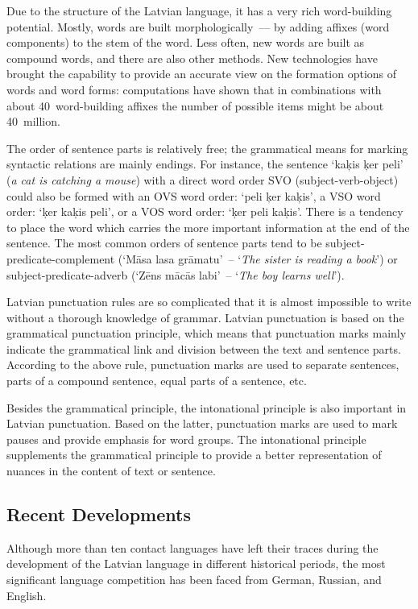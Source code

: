 \begin{multicols}{2}
Due to the structure of the Latvian language, it has a very rich word-building potential.
Mostly, words are built morphologically~--- by adding affixes (word components) to the stem of the word.
Less often, new words are built as compound words, and there are also other methods.
New technologies have brought the capability to provide an accurate view on the formation options of words and word forms: computations have shown that in combinations with about 40~word-building affixes the number of possible items might be about 40~million.


The order of sentence parts is relatively free; the grammatical means for marking syntactic relations are mainly endings.
For instance, the sentence `kaķis ķer peli' (\textit{a cat is catching a mouse}) with a direct word order SVO (subject-verb-object) could also be formed with an OVS word order: `peli ķer kaķis', a VSO word order: `ķer kaķis peli', or a VOS word order: `ķer peli kaķis'.
There is a tendency to place the word which carries the more important information at the end of the sentence.
The most common orders of sentence parts tend to be subject-predicate-complement (`Māsa lasa grāmatu'~-- `\textit{The sister is reading a book}') or subject-predicate-adverb (`Zēns mācās labi'~-- `\textit{The boy learns well}').

Latvian punctuation rules are so complicated that it is almost impossible to write without a thorough knowledge of grammar.
Latvian punctuation is based on the grammatical punctuation principle, which means that punctuation marks mainly indicate the grammatical link and division between the text and sentence parts.
According to the above rule, punctuation marks are used to separate sentences, parts of a compound sentence, equal parts of a sentence, etc.

Besides the grammatical principle, the intonational principle is also important in Latvian punctuation.
Based on the latter, punctuation marks are used to mark pauses and provide emphasis for word groups.
The intonational principle supplements the grammatical principle to provide a better representation of nuances in the content of text or sentence.

\subsection{Recent Developments}

Although more than ten contact languages have left their traces during the development of the Latvian language in different historical periods, the most significant language competition has been faced from German, Russian, and English.


\end{multicols}
